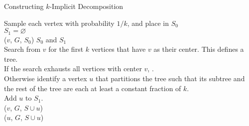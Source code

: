 \begin{algorithm}[t]
\caption{Constructing $k$-Implicit Decomposition}
\label{algo:genclusters}

\smallskip
    Sample each vertex with probability $1/k$, and place in $S_0$\label{line:sample}\\
    $S_1 = \varnothing$\\
     {
       ($v$, $G$, $S_0$)
    }
    \Return $S_0$ and $S_1$\\
    \smallskip
     {
       Search from $v$ for the first $k$ vertices
       that have $v$ as their center.  This defines a tree.\\
       If the search exhausts all vertices with center $v$, \Return.\\
       Otherwise identify a vertex $u$ that partitions the tree
       such that its subtree and the rest of the tree
       are each at least a constant fraction of $k$.\\
       Add $u$ to $S_1$.\\
       ($v$, $G$, $S \cup u$)\\
       ($u$, $G$, $S \cup u$)
   }
\end{algorithm}

